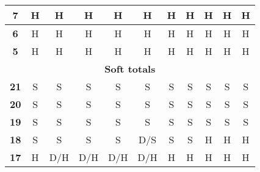 \documentclass[conference]{IEEEtran}
\begin{document}
\begin{table}[htbp]
\begin{tabular}{|c|c|c|c|c|c|c|c|c|c|c|}
\textbf{7} & \cellcolor[HTML]{FE0000}H & \cellcolor[HTML]{FE0000}H & \cellcolor[HTML]{FE0000}H & \cellcolor[HTML]{FE0000}H & \cellcolor[HTML]{FE0000}H & \cellcolor[HTML]{FE0000}H & \cellcolor[HTML]{FE0000}H & \cellcolor[HTML]{FE0000}H & \cellcolor[HTML]{FE0000}H & \cellcolor[HTML]{FE0000}H \\ \hline
\textbf{6} & \cellcolor[HTML]{FE0000}H & \cellcolor[HTML]{FE0000}H & \cellcolor[HTML]{FE0000}H & \cellcolor[HTML]{FE0000}H & \cellcolor[HTML]{FE0000}H & \cellcolor[HTML]{FE0000}H & \cellcolor[HTML]{FE0000}H & \cellcolor[HTML]{FE0000}H & \cellcolor[HTML]{FE0000}H & \cellcolor[HTML]{FE0000}H \\ \hline
\textbf{5} & \cellcolor[HTML]{FE0000}H & \cellcolor[HTML]{FE0000}H & \cellcolor[HTML]{FE0000}H & \cellcolor[HTML]{FE0000}H & \cellcolor[HTML]{FE0000}H & \cellcolor[HTML]{FE0000}H & \cellcolor[HTML]{FE0000}H & \cellcolor[HTML]{FE0000}H & \cellcolor[HTML]{FE0000}H & \cellcolor[HTML]{FE0000}H \\ \hline
\multicolumn{11}{|c|}{\textbf{Soft totals}} \\ \hline
\textbf{21} & \cellcolor[HTML]{32CB00}S & \cellcolor[HTML]{32CB00}S & \cellcolor[HTML]{32CB00}S & \cellcolor[HTML]{32CB00}S & \cellcolor[HTML]{32CB00}S & \cellcolor[HTML]{32CB00}S & \cellcolor[HTML]{32CB00}S & \cellcolor[HTML]{32CB00}S & \cellcolor[HTML]{32CB00}S & \cellcolor[HTML]{32CB00}S \\ \hline
\textbf{20} & \cellcolor[HTML]{32CB00}S & \cellcolor[HTML]{32CB00}S & \cellcolor[HTML]{32CB00}S & \cellcolor[HTML]{32CB00}S & \cellcolor[HTML]{32CB00}S & \cellcolor[HTML]{32CB00}S & \cellcolor[HTML]{32CB00}S & \cellcolor[HTML]{32CB00}S & \cellcolor[HTML]{32CB00}S & \cellcolor[HTML]{32CB00}S \\ \hline
\textbf{19} & \cellcolor[HTML]{32CB00}S & \cellcolor[HTML]{32CB00}S & \cellcolor[HTML]{32CB00}S & \cellcolor[HTML]{32CB00}S & \cellcolor[HTML]{32CB00}S & \cellcolor[HTML]{32CB00}S & \cellcolor[HTML]{32CB00}S & \cellcolor[HTML]{32CB00}S & \cellcolor[HTML]{32CB00}S & \cellcolor[HTML]{32CB00}S \\ \hline
\textbf{18} & \cellcolor[HTML]{32CB00}S & \cellcolor[HTML]{32CB00}S & \cellcolor[HTML]{32CB00}S & \cellcolor[HTML]{32CB00}S & \cellcolor[HTML]{FFC702}D/S & \cellcolor[HTML]{32CB00}S & \cellcolor[HTML]{32CB00}S & \cellcolor[HTML]{FE0000}H & \cellcolor[HTML]{FE0000}H & \cellcolor[HTML]{FE0000}H \\ \hline
\textbf{17} & \cellcolor[HTML]{FE0000}H & \cellcolor[HTML]{FFC702}D/H & \cellcolor[HTML]{FFC702}D/H & \cellcolor[HTML]{FFC702}D/H & \cellcolor[HTML]{FFC702}D/H & \cellcolor[HTML]{FE0000}H & \cellcolor[HTML]{FE0000}H & \cellcolor[HTML]{FE0000}H & \cellcolor[HTML]{FE0000}H & \cellcolor[HTML]{FE0000}H \\ \hline

\end{tabular}
\end{table}
\end{document}
